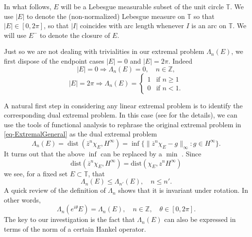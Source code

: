 \documentclass[11pt,reqno]{amsart}
\numberwithin{equation}{section}
\theoremstyle{plain}
\theoremstyle{definition}
\begin{document}
	In what follows, $E$ will be a Lebesgue measurable subset of the unit circle ${\mathbb{T}}$. We use $|E|$ to denote the (non-normalized) Lebesgue measure on ${\mathbb{T}}$
	so that $|E| \in [0, 2 \pi]$, so that $|I|$ coincides with arc length whenever $I$ is an arc on ${\mathbb{T}}$. We will use $E^{-}$ to denote the closure of $E$.
	
	Just so we are not dealing with trivialities in our extremal problem $\Lambda_{n}(E)$, we first dispose of the endpoint cases $|E| = 0$ and $|E| = 2 \pi$. Indeed 
	\begin{equation} \label{endpoint0}
	|E| = 0 \Rightarrow \Lambda_{n}(E) = 0, \quad n \in { \mathbb{Z}},
	\end{equation}
	\begin{equation} \label{endpoint2pi}
	|E| = 2 \pi \Rightarrow \Lambda_{n}(E) = \begin{cases} 1 &\mbox{if } n \geq 1 \\ 
0& \mbox{if } n < 1.
	\end{cases}
	\end{equation}
	
	
	A natural first step in considering any linear extremal problem is to identify the corresponding dual extremal problem.  In this case (see \cite{Ga} for the details), we can use the tools of functional analysis to rephrase the original extremal problem in \eqref{eq-ExtremalGeneral} as the dual extremal problem
	\begin{equation}\label{eq:definition of lambda_n with distance}
		 \Lambda_n(E)= {\operatorname{dist}}(\bar z^n\chi_E, H^\infty) = \inf\{\|\overline{z}^{n} \chi_{E} - g\|_{\infty}: g \in H^{\infty}\}.
	\end{equation}
	It turns out that the above \emph{$\inf$} can be replaced by a \emph{$\min$} \cite[p.~146]{Koosis}. 
	Since $$\mbox{dist}(\overline{z}^n \chi_{E}, H^{\infty}) = \mbox{dist}(\chi_{E}, z^n H^{\infty})$$ we see, for a fixed set $E \subset {\mathbb{T}}$, that 
	\begin{equation} \label{increasinginn}
	\Lambda_n(E) \le \Lambda_{n'}(E), \quad n \leq n'.
	\end{equation}
	 A quick review of the definition of $\Lambda_{n}$  shows that it is invariant under rotation. In other words, 
	 \begin{equation} \label{rotation-invariant}
	 \Lambda_{n}(e^{i \theta} E) = \Lambda_{n}(E), \quad n \in { \mathbb{Z}}, \quad \theta \in [0, 2 \pi].
	 \end{equation}
	The key to our investigation is the fact that $\Lambda_{n}(E)$ can also be 
	expressed in terms of the norm of a certain Hankel operator.  
	
\end{document}

